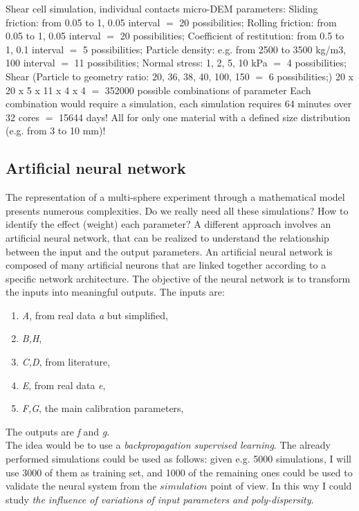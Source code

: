 Shear cell simulation, individual contacts micro-DEM parameters:
Sliding friction: from 0.05 to 1, 0.05 interval $=$ 20 possibilities;
Rolling friction: from 0.05 to 1, 0.05 interval $=$ 20 possibilities;
Coefficient  of restitution: from 0.5 to 1, 0.1 interval $=$ 5 possibilities;
Particle density: e.g. from 2500 to 3500 kg/m3, 100 interval $=$ 11 possibilities;
Normal stress: 1, 2, 5, 10 kPa $=$ 4 possibilities;
Shear %
(Particle to geometry ratio: 20, 36, 38, 40, 100, 150 $=$ 6 possibilities;)
20 x 20 x 5 x 11 x 4 x 4 $=$ 352000 possible combinations of parameter
Each combination would require a simulation, each simulation requires 64 minutes over 32 cores $=$ 15644 days!
All for only one material with a defined size distribution (e.g. from 3 to 10 mm)!


\subsection{Artificial neural network}
\label{subsection:artificialneuralnetwork}

The representation of a multi-sphere experiment through a mathematical model presents numerous complexities.
Do we really need all these simulations?
How to identify the effect (weight) each parameter?
A different approach involves an artificial neural network, that can be realized to understand the relationship between the input and the output parameters.
An artificial neural network is composed of many artificial neurons that are linked together according to a specific network architecture. The objective of the neural network is to transform the inputs into meaningful outputs.
The inputs are:
\begin{enumerate}
\item{\textit{A}, from real data \textit{a} but simplified,}
\item{\textit{B,H},}
\item{\textit{C,D}, from literature,}
\item{\textit{E}, from real data \textit{e},}
\item{\textit{F,G}, the main calibration parameters,}
\end{enumerate}

The outputs are \textit{f} and \textit{g}.\\

The idea would be to use a \textit{backpropagation supervised learning}. The already performed simulations could be used as follows: given e.g. 5000 simulations, I will use 3000 of them as training set, and 1000 of the remaining ones could be used to validate the neural system from the $simulation$ point of view.
In this way I could study \textit{the influence of variations of input parameters and poly-dispersity}.\\

